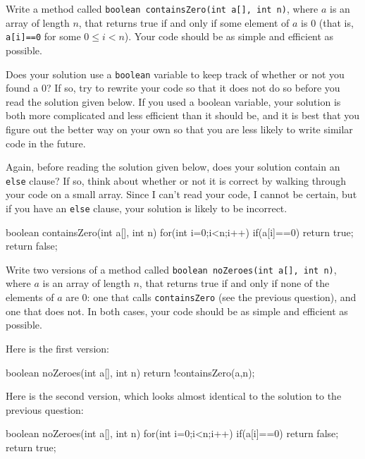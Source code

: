 \begin{requ}
Write a method called \verb+boolean containsZero(int a[], int n)+, where $a$ is an array of length $n$,
that returns true if and only if some element of $a$ is 0 (that is, \verb+a[i]==0+ for some $0\leq i<n$). 
Your code should be as simple and efficient as possible.
\begin{requanswer}
Does your solution use a \verb+boolean+ variable to keep track of whether or not you found a 0? 
If so, try to rewrite your code so that it does not do so before you read the solution given below.
If you used a boolean variable, your solution is both more complicated and less efficient than it should be,
and it is best that you figure out the better way on your own so that you are less likely to write similar
code in the future.

Again, before reading the solution given below, does your solution contain an \verb+else+ clause? 
If so, think about whether or not it is correct by walking through your code on a small array.
Since I can't read your code, I cannot be certain, but if you have an \verb+else+ clause, 
your solution is likely to be incorrect.
\begin{code}
boolean containsZero(int a[], int n) {
    for(int i=0;i<n;i++) {
        if(a[i]==0) {
            return true;
        }
    }
    return false;
}
\end{code}
\end{requanswer}
\end{requ}

\begin{requ}\label{exer:noZeroes}
Write two versions of a method called \verb+boolean noZeroes(int a[], int n)+, 
where $a$ is an array of length $n$,
that returns true if and only if none of the elements of $a$ are 0: 
one that calls \verb+containsZero+ (see the previous question), and one that does not.
In both cases, your code should be as simple and efficient as possible.
\begin{requanswer}
Here is the first version:
\begin{code}
boolean noZeroes(int a[], int n) {
    return !containsZero(a,n);
}
\end{code}
Here is the second version, which looks almost identical to the solution to the previous question:
\begin{code}
boolean noZeroes(int a[], int n) {
    for(int i=0;i<n;i++) {
        if(a[i]==0) {
            return false;
        }
    }
    return true;
}
\end{code}
\end{requanswer}
\end{requ}


